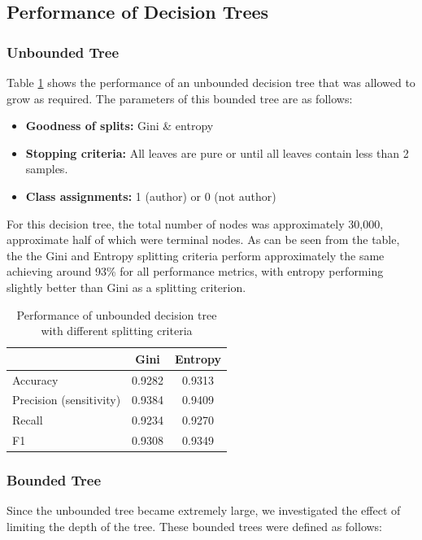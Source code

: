 \documentclass[letterpaper,12pt]{article}
\begin{document}
\subsection{Performance of Decision Trees}
\subsubsection{Unbounded Tree}\label{sec:unbounded}
Table \ref{performance} shows the performance of an unbounded decision tree that was allowed to grow as required. The parameters of this bounded tree are as follows:

\begin{itemize}
\item\textbf{Goodness of splits:} Gini \& entropy
\item\textbf{Stopping criteria:} All leaves are pure or until all leaves contain less than 2 samples.
\item\textbf{Class assignments:} 1 (author) or 0 (not author)
\end{itemize}

For this decision tree, the total number of nodes was approximately 30,000, approximate half of which were terminal nodes. As can be seen from the table, the the Gini and Entropy splitting criteria perform approximately the same achieving around 93\% for all performance metrics, with entropy performing slightly better than Gini as a splitting criterion. 


\begin{table}[h]
\centering
\caption{Performance of unbounded decision tree with different splitting criteria}\label{performance}
\begin{tabular}{|l|c|c|}
\hline
& Gini & Entropy\\\hline
Accuracy & 0.9282 & 0.9313\\\hline
Precision (sensitivity) & 0.9384 & 0.9409\\\hline
Recall & 0.9234 & 0.9270\\\hline
F1 & 0.9308 & 0.9349\\\hline
\end{tabular}
\end{table}

\subsubsection{Bounded Tree}
Since the unbounded tree became extremely large, we investigated the effect of limiting the depth of the tree. These bounded trees were defined as follows:
\end{document}
